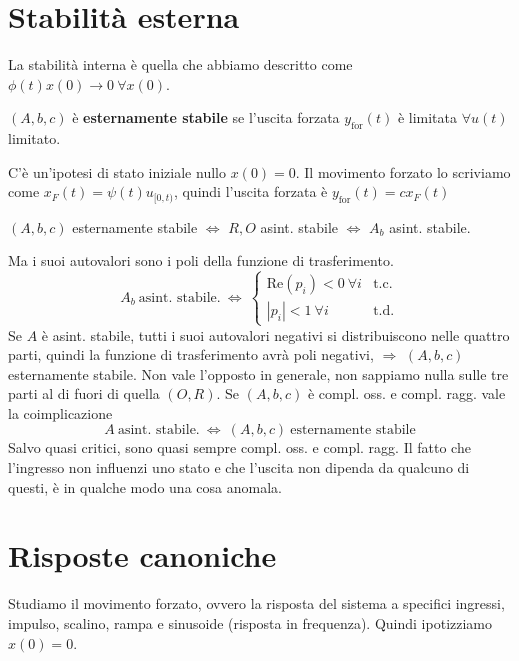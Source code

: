 \documentclass[10pt,a4paper]{book}
\begin{document}
\chapter{Stabilità esterna}

La stabilità interna è quella che abbiamo descritto come $\phi ( t) x( 0)\rightarrow 0\ \forall x( 0)$.
\begin{definition}
$( A,b,c)$ è \textbf{esternamente stabile} se l'uscita forzata $y_{\text{for}}( t)$ è limitata $\forall u( t)$ limitato.
\end{definition}
C'è un'ipotesi di stato iniziale nullo $x( 0) =0$. Il movimento forzato lo scriviamo come $x_{F}( t) =\psi ( t) u_{[ 0,t)}$, quindi l'uscita forzata è $y_{\text{for}}( t) =cx_{F}( t)$
\begin{theorem}
$( A,b,c)$ esternamente stabile $\Leftrightarrow $ $R,O$ asint. stabile $\Leftrightarrow $ $A_{b}$ asint. stabile.
\end{theorem}
Ma i suoi autovalori sono i poli della funzione di trasferimento.
\begin{equation*}
A_{b} \ \text{asint. stabile.} \ \Leftrightarrow \ \begin{cases}
\mathrm{Re}( p_{i}) < 0\ \forall i & \text{t.c.}\\
| p_{i}| < 1\ \forall i & \text{t.d.}
\end{cases}
\end{equation*}
Se $A$ è asint. stabile, tutti i suoi autovalori negativi si distribuiscono nelle quattro parti, quindi la funzione di trasferimento avrà poli negativi, $\Rightarrow $ $( A,b,c)$ esternamente stabile. Non vale l'opposto in generale, non sappiamo nulla sulle tre parti al di fuori di quella $( O,R)$. Se $( A,b,c)$ è compl. oss. e compl. ragg. vale la coimplicazione
\begin{equation*}
A\ \text{asint. stabile.} \ \Leftrightarrow \ ( A,b,c) \ \text{esternamente stabile}
\end{equation*}
Salvo quasi critici, sono quasi sempre compl. oss. e compl. ragg. Il fatto che l'ingresso non influenzi uno stato e che l'uscita non dipenda da qualcuno di questi, è in qualche modo una cosa anomala.
\chapter{Risposte canoniche}

Studiamo il movimento forzato, ovvero la risposta del sistema a specifici ingressi, impulso, scalino, rampa e sinusoide (risposta in frequenza). Quindi ipotizziamo $x( 0) =0$.
\end{document}
